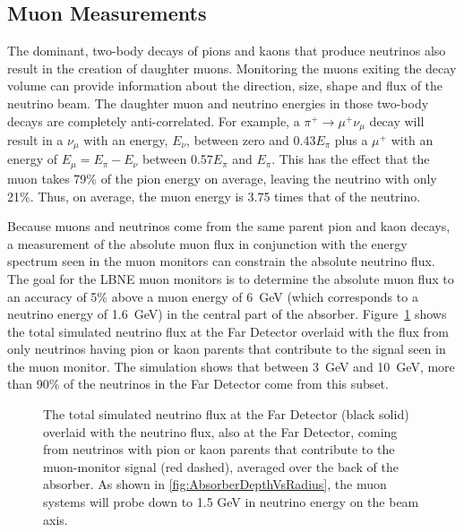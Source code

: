 \subsection{Muon Measurements}
\label{v3ch3-muon-meas}
The dominant, two-body decays of pions and kaons that produce
neutrinos also result in the creation of daughter muons. Monitoring
the muons exiting the decay volume can provide information about the
direction, size, shape and flux of the neutrino beam.  The daughter
muon and neutrino energies in those two-body decays are completely
anti-correlated. For example, a $\pi^+\rightarrow \mu^+\nu_\mu$
decay will result in a $\nu_\mu$ with an energy, $E_\nu$, between
zero and 0.43$E_\pi$ plus a $\mu^+$ with an energy of 
$E_\mu=E_\pi-E_\nu$ between 0.57$E_\pi$ and $E_\pi$. This has the
effect that the muon takes 79\% of the pion energy on average,  
leaving the neutrino with only  21\%. Thus, on average, the
muon energy is 3.75 times that of the neutrino.

Because muons and neutrinos come from the same parent pion and kaon
decays, a measurement of the absolute muon flux in conjunction with the energy spectrum
seen in the muon monitors can constrain the absolute neutrino flux.  The
goal for the LBNE muon monitors is to determine the absolute muon flux
to an accuracy of 5\% above a muon energy of 6~GeV (which corresponds to
a neutrino energy of 1.6~GeV) in the central part of the absorber.
Figure~\ref{fig:nu_mumon_frac} shows the total simulated neutrino flux at the Far Detector overlaid with the flux from only neutrinos having pion or kaon parents that contribute to the signal
seen in the muon monitor.  The simulation shows that between 3~GeV and 10~GeV, more than 90\% of 
the neutrinos in the Far Detector come from this subset.

\begin{figure}[htbp]
\begin{center}
\caption[Simulated neutrino fluxes at Far Detector]{The total simulated neutrino flux at the Far Detector (black solid) overlaid with the neutrino flux, also at the Far Detector, coming from
neutrinos with pion or kaon parents that contribute to the muon-monitor signal (red dashed), averaged over the back of the absorber. As shown in \ref{fig:AbsorberDepthVsRadius}, the muon systems will probe down to 1.5 GeV in neutrino energy on the beam axis.}
\label{fig:nu_mumon_frac}
\end{center}
\end{figure}


